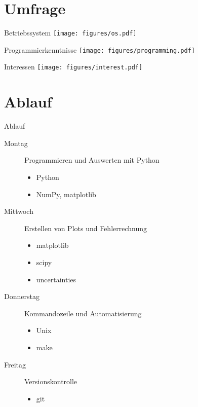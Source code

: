 \section{Umfrage}


\begin{frame}{Betriebssystem}
  \centering
  \texttt{[image: figures/os.pdf]}
\end{frame}

\begin{frame}{Programmierkenntnisse}
  \centering
  \texttt{[image: figures/programming.pdf]}
\end{frame}

\begin{frame}{Interessen}
  \centering
  \texttt{[image: figures/interest.pdf]}
\end{frame}

\section{Ablauf}

\begin{frame}{Ablauf}
  \begin{description}
    \item[Montag] Programmieren und Auswerten mit Python
      \begin{itemize}
        \item Python
        \item NumPy, matplotlib
      \end{itemize}
    \item[Mittwoch] Erstellen von Plots und Fehlerrechnung
      \begin{itemize}
        \item matplotlib
        \item scipy
        \item uncertainties
      \end{itemize}
    \item[Donnerstag] Kommandozeile und Automatisierung
      \begin{itemize}
        \item Unix
        \item make
      \end{itemize}
    \item[Freitag] Versionskontrolle
      \begin{itemize}
        \item git
      \end{itemize}
  \end{description}
\end{frame}

